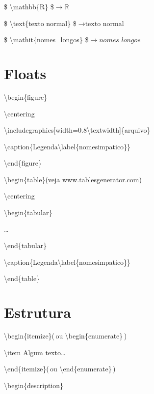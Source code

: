 \documentclass[10pt,twoside,english,brazilian]{article}
\begin{document}
\begin{multicols}{3}
\vspace{\baselineskip}


\$ \textbackslash{}mathbb\{R\} \$\enspace $\rightarrow \mathbb{R}$

\$ \textbackslash{}text\{texto normal\} \$\enspace $\rightarrow \text{texto normal}$

\$ \textbackslash{}mathit\{nomes\_longos\} \$\enspace $\rightarrow \mathit{nomes\_longos}$


\section*{Floats}

\textbackslash{}begin\{figure\}

\quad\textbackslash{}centering

\quad\textbackslash{}includegraphics[width=0.8\textbackslash{}textwidth]\{arquivo\}

\quad\textbackslash{}caption\{Legenda\textbackslash{}label\{nomesimpatico\}\}

\textbackslash{}end\{figure\}


\vspace{\baselineskip}


\textbackslash{}begin\{table\}\quad (veja \url{www.tablesgenerator.com})

\quad\textbackslash{}centering

\quad\textbackslash{}begin\{tabular\}

\quad\quad\dots

\quad\textbackslash{}end\{tabular\}

\quad\textbackslash{}caption\{Legenda\textbackslash{}label\{nomesimpatico\}\}

\textbackslash{}end\{table\}

\columnbreak


\section*{Estrutura}

\textbackslash{}begin\{itemize\}\quad (\,ou \textbackslash{}begin\{enumerate\}\,)

\quad\textbackslash{}item Algum texto\dots

\textbackslash{}end\{itemize\}\quad (\,ou \textbackslash{}end\{enumerate\}\,)


\vspace{\baselineskip}


\textbackslash{}begin\{description\}


\end{multicols}
\end{document}
